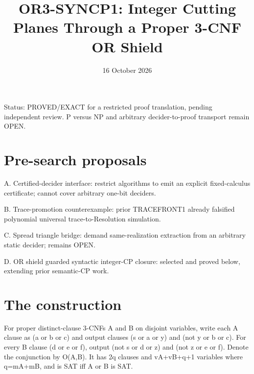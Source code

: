 \documentclass{article}
\title{OR3-SYNCP1: Integer Cutting Planes Through a Proper 3-CNF OR Shield}
\date{16 October 2026}
\begin{document}
\maketitle
\noindent Status: PROVED/EXACT for a restricted proof translation, pending independent review. P versus NP and arbitrary decider-to-proof transport remain OPEN.
\section{Pre-search proposals}
\noindent A. Certified-decider interface: restrict algorithms to emit an explicit fixed-calculus certificate; cannot cover arbitrary one-bit deciders.
\par\noindent B. Trace-promotion counterexample: prior TRACEFRONT1 already falsified polynomial universal trace-to-Resolution simulation.
\par\noindent C. Spread triangle bridge: demand same-realization extraction from an arbitrary static decider; remains OPEN.
\par\noindent D. OR shield guarded syntactic integer-CP closure: selected and proved below, extending prior semantic-CP work.
\section{The construction}
For proper distinct-clause 3-CNFs A and B on disjoint variables, write each A clause as (a or b or c) and output clauses (s or a or y) and (not y or b or c). For every B clause (d or e or f), output (not s or d or z) and (not z or e or f). Denote the conjunction by O(A,B). It has 2q clauses and vA+vB+q+1 variables where q=mA+mB, and is SAT iff A or B is SAT.
\end{document}
